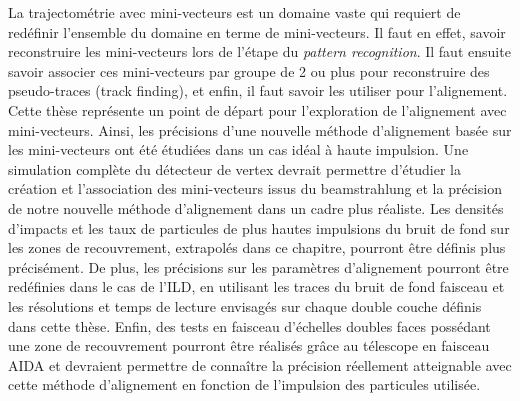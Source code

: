   La trajectom\'etrie avec mini-vecteurs est un domaine vaste qui requiert de red\'efinir l'ensemble du domaine en terme de mini-vecteurs. Il faut en effet, savoir reconstruire les mini-vecteurs lors de l'\'etape du \textit{pattern recognition}. Il faut ensuite savoir associer ces mini-vecteurs par groupe de 2 ou plus pour reconstruire des pseudo-traces (track finding), et enfin, il faut savoir les utiliser pour l'alignement. Cette th\`ese repr\'esente un point de d\'epart pour l'exploration de l'alignement avec mini-vecteurs. Ainsi, les pr\'ecisions d'une nouvelle m\'ethode d'alignement bas\'ee sur les mini-vecteurs ont \'et\'e \'etudi\'ees dans un cas id\'eal \`a haute impulsion. Une simulation compl\`ete du d\'etecteur de vertex devrait permettre d'\'etudier la création et l'association des mini-vecteurs issus du beamstrahlung et la pr\'ecision de notre nouvelle m\'ethode d'alignement dans un cadre plus r\'ealiste. Les densit\'es d'impacts et les taux de particules de plus hautes impulsions du bruit de fond sur les zones de recouvrement, extrapol\'es dans ce chapitre, pourront \^etre d\'efinis plus pr\'ecis\'ement. De plus, les pr\'ecisions sur les param\`etres d'alignement pourront \^etre red\'efinies dans le cas de l'ILD, en utilisant les traces du bruit de fond faisceau et les r\'esolutions et temps de lecture envisag\'es sur chaque double couche d\'efinis dans cette th\`ese. Enfin, des tests en faisceau d'échelles doubles faces possédant une zone de recouvrement pourront \^etre r\'ealis\'es gr\^ace au télescope en faisceau AIDA et devraient permettre de connaître la pr\'ecision r\'eellement atteignable avec cette m\'ethode d'alignement en fonction de l'impulsion des particules utilis\'ee.
  
  
  

%   
  
